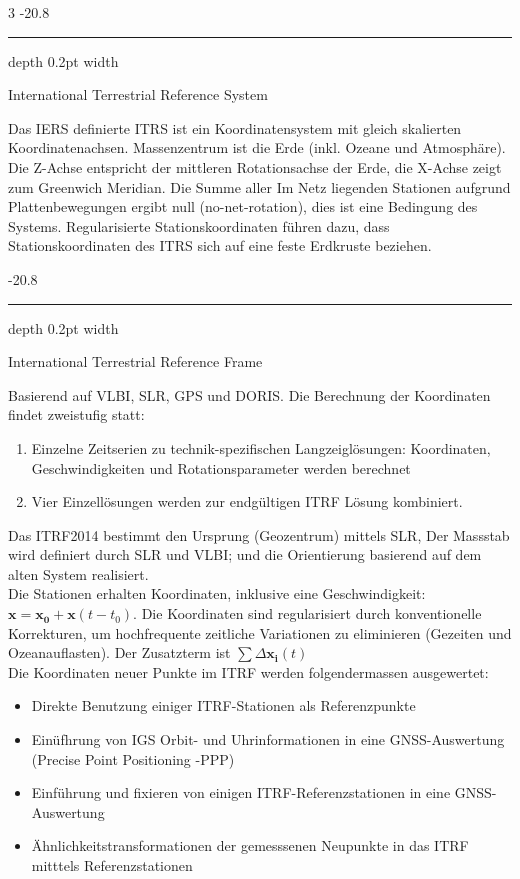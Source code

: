 \documentclass[9pt, landscape, fleqn]{scrartcl}
\makeatletter
\renewcommand{\subsubsection}{\@startsection{subsubsection}{1}{0mm}%
{-2\baselineskip}{0.8\baselineskip}%
{\hrule depth 0.2pt width\columnwidth\vspace*{1.2em}\normalsize\bfseries\rmfamily}}
\makeatother
\begin{document}
\begin{multicols*}{3}
\subsubsection{International Terrestrial Reference System}

Das IERS definierte ITRS ist ein Koordinatensystem mit gleich skalierten Koordinatenachsen. Massenzentrum ist die Erde (inkl. Ozeane und Atmosphäre). Die Z-Achse entspricht der mittleren Rotationsachse der Erde, 
die X-Achse zeigt zum Greenwich Meridian. Die Summe aller Im Netz liegenden Stationen aufgrund Plattenbewegungen ergibt null (no-net-rotation), dies ist eine Bedingung des Systems. Regularisierte Stationskoordinaten führen dazu, dass Stationskoordinaten des ITRS sich auf eine feste Erdkruste beziehen.

\subsubsection{International Terrestrial Reference Frame}

Basierend auf VLBI, SLR, GPS und DORIS. Die Berechnung der Koordinaten findet zweistufig statt:

\begin{enumerate}
    \item Einzelne Zeitserien zu technik-spezifischen Langzeiglösungen: Koordinaten, Geschwindigkeiten und Rotationsparameter werden berechnet
    \item Vier Einzellösungen werden zur endgültigen ITRF Lösung kombiniert.
\end{enumerate}

Das ITRF2014 bestimmt den Ursprung (Geozentrum) mittels SLR, Der Massstab wird definiert durch SLR und VLBI; und die Orientierung basierend auf dem alten System realisiert. \\
Die Stationen erhalten Koordinaten, inklusive eine Geschwindigkeit: $\mathbf{x} = \mathbf{x_0} + \mathbf{x}(t-t_0)$. Die Koordinaten sind regularisiert durch konventionelle Korrekturen, um hochfrequente zeitliche Variationen zu eliminieren (Gezeiten und Ozeanauflasten). Der Zusatzterm ist $\sum \Delta \mathbf{x_i}(t)$ \\
Die Koordinaten neuer Punkte im ITRF werden folgendermassen ausgewertet:

\begin{itemize}
    \item Direkte Benutzung einiger ITRF-Stationen als Referenzpunkte
    \item Einüfhrung von IGS Orbit- und Uhrinformationen in eine GNSS-Auswertung (Precise Point Positioning -PPP)
    \item Einführung und fixieren von einigen ITRF-Referenzstationen in eine GNSS-Auswertung
    \item Ähnlichkeitstransformationen der gemesssenen Neupunkte in das ITRF mitttels Referenzstationen
\end{itemize}


\end{multicols*}
\end{document}
